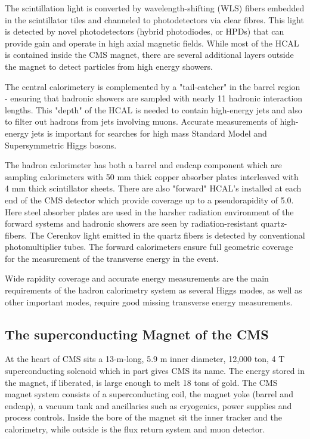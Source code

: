 The scintillation light is converted by wavelength-shifting (WLS) fibers embedded in the scintillator tiles and channeled to photodetectors via clear fibres. This light is detected by novel photodetectors (hybrid photodiodes, or HPDs) that can provide gain and operate in high axial magnetic fields. While most of the HCAL is contained inside the CMS magnet, there are several additional layers outside the magnet to detect particles from high energy showers.

The central calorimetery is complemented by a "tail-catcher" in the barrel region - ensuring that hadronic showers are sampled with nearly 11 hadronic interaction lengths. This "depth" of the HCAL is needed to contain high-energy jets and also to filter out hadrons from jets involving muons. Accurate measurements of high-energy jets is important for searches for high mass Standard Model and Supersymmetric Higgs bosons.

The hadron calorimeter has both a barrel and endcap component which are sampling calorimeters with 50 mm thick copper absorber plates interleaved with 4 mm thick scintillator sheets. There are also "forward" HCAL's installed at each end of the CMS detector which provide coverage up to a pseudorapidity of 5.0. Here steel absorber plates are used in the harsher radiation environment of the forward systems and hadronic showers are seen by radiation-resistant quartz-fibers. The Cerenkov light emitted in the quartz fibers is detected by conventional photomultiplier tubes. The forward calorimeters ensure full geometric coverage for the measurement of the transverse energy in the event.

Wide rapidity coverage and accurate energy measurements are the main requirements of the hadron calorimetry system as several Higgs modes, as well as other important modes, require good missing transverse energy measurements.
\subsection{The superconducting Magnet  of the CMS}

At the heart of CMS sits a 13-m-long, 5.9 m inner diameter, 12,000 ton, 4 T superconducting solenoid which in part gives CMS its name. The energy stored in the magnet, if liberated, is large enough to melt 18 tons of gold. The CMS magnet system consists of a superconducting coil, the magnet yoke (barrel and endcap), a vacuum tank and ancillaries such as cryogenics, power supplies and process controls. Inside the bore of the magnet sit the inner tracker and the calorimetry, while outside is the flux return system and muon detector.

